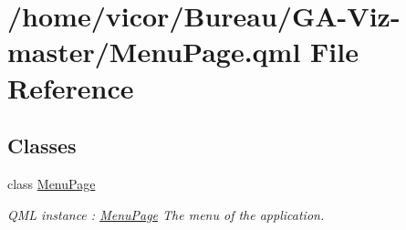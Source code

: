 \hypertarget{_menu_page_8qml}{}\section{/home/vicor/\+Bureau/\+G\+A-\/\+Viz-\/master/\+Menu\+Page.qml File Reference}
\label{_menu_page_8qml}
\subsection*{Classes}
\begin{DoxyCompactItemize}
\item 
class \hyperlink{class_menu_page}{Menu\+Page}
\begin{DoxyCompactList}\small\item\em Q\+ML instance \+: \hyperlink{class_menu_page}{Menu\+Page} The menu of the application. \end{DoxyCompactList}\end{DoxyCompactItemize}
